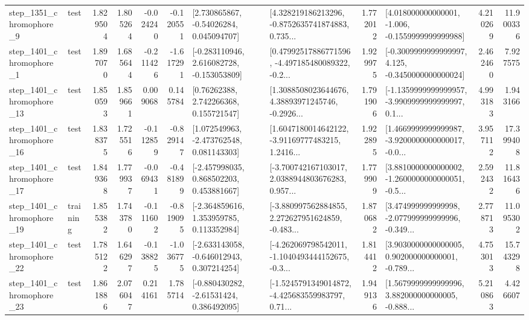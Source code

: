 \begin{tabular}{llrrrrllrlrr}
  step\_1351\_chromophore\_9 &      test &      1.829504 &    1.805264 &     -0.024240 & -0.120551 &     [2.730865867, -0.54026284, 0.045094707] &  [4.328219186213296, -0.8752635741874883, 0.735... &       1.772012 &   [4.018000000000001, -1.006, -0.1559999999999988] &            4.210269 &         11.900336 \\
  step\_1401\_chromophore\_1 &      test &      1.897070 &    1.685644 &     -0.211426 & -1.617291 &   [-0.283110946, 2.616082728, -0.153053809] &  [0.47992517886771596, -4.497185480089322, -0.2... &       1.929975 &  [-0.3009999999999997, 4.125, -0.3450000000000024] &            2.462460 &          7.927575 \\
 step\_1401\_chromophore\_13 &      test &      1.850593 &    1.859661 &      0.009068 &  0.145784 &      [0.76262388, 2.742266368, 0.155721547] &  [1.3088508023644676, 4.38893971245746, -0.2926... &       1.791906 &  [-1.1359999999999957, -3.9909999999999997, 0.1... &            4.993183 &          1.943166 \\
 step\_1401\_chromophore\_16 &      test &      1.838375 &    1.725516 &     -0.112859 & -0.829147 &    [1.072549963, -2.473762548, 0.081143303] &  [1.6047180014642122, -3.91169777483215, 1.2416... &       1.922895 &  [1.4669999999999987, -3.9200000000000017, -0.0... &            3.957112 &         17.399408 \\
 step\_1401\_chromophore\_17 &      test &      1.849368 &    1.779937 &     -0.069431 & -0.481899 &    [-2.457998035, 0.868502203, 0.453881667] &  [-3.700742167103017, 2.0388944803676283, 0.957... &       1.779909 &  [3.8810000000000002, -1.2600000000000051, -0.5... &            2.592432 &         11.816436 \\
 step\_1401\_chromophore\_19 &  training &      1.855382 &    1.743780 &     -0.111602 & -0.819095 &    [-2.364859616, 1.353959785, 0.113352984] &  [-3.880997562884855, 2.272627951624859, -0.483... &       1.870682 &  [3.474999999999998, -2.077999999999996, -0.349... &            2.778713 &         11.095302 \\
 step\_1401\_chromophore\_22 &      test &      1.785122 &    1.646297 &     -0.138825 & -1.036775 &   [-2.633143058, -0.646012943, 0.307214254] &  [-4.262069798542011, -1.1040493444152675, -0.3... &       1.814412 &  [3.9030000000000005, 0.902000000000001, -0.789... &            4.753013 &         15.743298 \\
 step\_1401\_chromophore\_23 &      test &      1.861886 &    2.076047 &      0.214161 &  1.785714 &    [-0.880430282, -2.61531424, 0.386492095] &  [-1.5245791349014872, -4.425683559983797, 0.71... &       1.949136 &  [1.5679999999999996, 3.882000000000005, -0.888... &            5.210863 &          4.426607 \\

\end{tabular}
